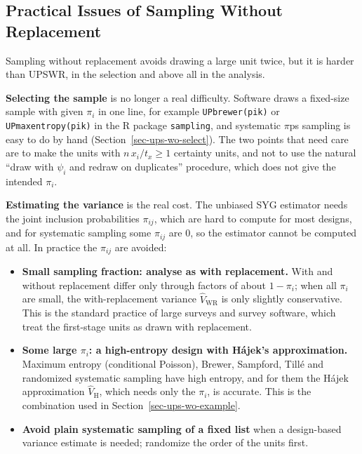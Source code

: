 \documentclass[
  letterpaper,
  DIV=11,
  numbers=noendperiod]{scrreprt}
\providecommand{\tightlist}{%
  \setlength{\itemsep}{0pt}\setlength{\parskip}{0pt}}
\renewcommand{\[}{\begin{equation}}
\renewcommand{\]}{\end{equation}}
\begin{document}
\subsection{Practical Issues of Sampling Without
Replacement}\label{sec-ups-wo-practice}

Sampling without replacement avoids drawing a large unit twice, but it
is harder than UPSWR, in the selection and above all in the analysis.

\textbf{Selecting the sample} is no longer a real difficulty. Software
draws a fixed-size sample with given \(\pi_i\) in one line, for example
\texttt{UPbrewer(pik)} or \texttt{UPmaxentropy(pik)} in the R package
\texttt{sampling}, and systematic \(\pi\)ps sampling is easy to do by
hand (Section~\ref{sec-ups-wo-select}). The two points that need care
are to make the units with \(n\,x_i/t_x\ge1\) certainty units, and not
to use the natural ``draw with \(\psi_i\) and redraw on duplicates''
procedure, which does not give the intended \(\pi_i\).

\textbf{Estimating the variance} is the real cost. The unbiased SYG
estimator needs the joint inclusion probabilities \(\pi_{ij}\), which
are hard to compute for most designs, and for systematic sampling some
\(\pi_{ij}\) are \(0\), so the estimator cannot be computed at all. In
practice the \(\pi_{ij}\) are avoided:

\begin{itemize}
\tightlist
\item
  \textbf{Small sampling fraction: analyse as with replacement.} With
  and without replacement differ only through factors of about
  \(1-\pi_i\); when all \(\pi_i\) are small, the with-replacement
  variance \(\hat V_{\mathrm{WR}}\) is only slightly conservative. This
  is the standard practice of large surveys and survey software, which
  treat the first-stage units as drawn with replacement.
\item
  \textbf{Some large \(\pi_i\): a high-entropy design with Hájek's
  approximation.} Maximum entropy (conditional Poisson), Brewer,
  Sampford, Tillé and randomized systematic sampling have high entropy,
  and for them the Hájek approximation \(\hat V_{\mathrm{H}}\), which
  needs only the \(\pi_i\), is accurate. This is the combination used in
  Section~\ref{sec-ups-wo-example}.
\item
  \textbf{Avoid plain systematic sampling of a fixed list} when a
  design-based variance estimate is needed; randomize the order of the
  units first.
\end{itemize}
\end{document}
